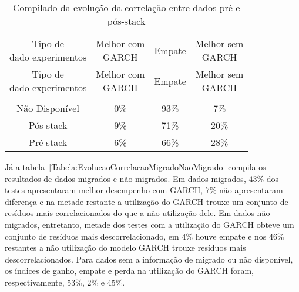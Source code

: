 \begin{center}
\begin{longtable}{cccc}
\toprule
\rowcolor{white}
\caption{Compilado da evolução da correlação entre dados pré e pós-stack}
\label{Tabela:EvolucaoCorrelacaoPrePosStack} \\
\midrule
\rowcolor{white}
   \specialcell{Tipo de\\dado experimentos} & \specialcell{Melhor com\\GARCH} &
   Empate & \specialcell{Melhor sem\\GARCH} \\
\midrule
\endfirsthead
\midrule
\rowcolor{white}
   \specialcell{Tipo de\\dado experimentos} & \specialcell{Melhor com\\GARCH} &
   Empate & \specialcell{Melhor sem\\GARCH} \\
\toprule
\endhead
\midrule \\ %
\endfoot
\bottomrule
\endlastfoot
    Não Disponível & 0\%   & 93\%  & 7\% \\
    Pós-stack & 9\%   & 71\%  & 20\% \\
    Pré-stack & 6\%   & 66\%  & 28\%
\end{longtable}
\end{center}

Já a tabela~\ref{Tabela:EvolucaoCorrelacaoMigradoNaoMigrado} compila os resultados de dados migrados e não
migrados. Em dados migrados, $43\%$ dos testes apresentaram melhor desempenho
com GARCH, $7\%$ não apresentaram diferença e na metade restante a utilização do
GARCH trouxe um conjunto de resíduos mais correlacionados do que a não
utilização dele. Em dados não migrados, entretanto, metade dos testes com a
utilização do GARCH obteve um conjunto de resíduos mais descorrelacionado, em
$4\%$ houve empate e nos $46\%$ restantes a não utilização do modelo GARCH
trouxe resíduos mais descorrelacionados. Para dados sem a informação de migrado
ou não disponível, os índices de ganho, empate e perda na utilização do GARCH
foram, respectivamente, 53\%, 2\% e 45\%.

